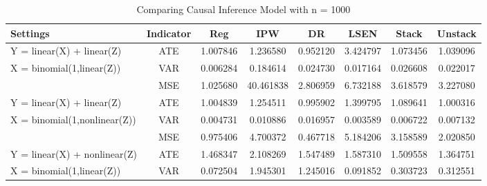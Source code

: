 \documentclass{elegantpaper}
\begin{document}
\begin{table}[H]
  \small
  \centering
  \caption{Comparing Causal Inference Model with n = 1000}
    \begin{tabular}{llllllll}
    \toprule
    Settings & \multicolumn{1}{c}{Indicator} &\multicolumn{1}{c}{Reg} & \multicolumn{1}{c}{IPW} & \multicolumn{1}{c}{DR} & \multicolumn{1}{c}{LSEN} & \multicolumn{1}{c}{Stack} & \multicolumn{1}{c}{Unstack}\\
   
    \midrule
    Y = linear(X) + linear(Z) & \multicolumn{1}{c}{ATE} & \multicolumn{1}{c}{1.007846} & \multicolumn{1}{c}{1.236580} & \multicolumn{1}{c}{0.952120} & \multicolumn{1}{c}{3.424797}& \multicolumn{1}{c}{1.073456} & \multicolumn{1}{c}{1.039096}\\
    X = binomial(1,linear(Z)) & \multicolumn{1}{c}{VAR} & \multicolumn{1}{c}{0.006284} & \multicolumn{1}{c}{0.184614} & \multicolumn{1}{c}{0.024730} & \multicolumn{1}{c}{0.017164}& \multicolumn{1}{c}{0.026608} & \multicolumn{1}{c}{0.022017}\\
        & \multicolumn{1}{c}{MSE} & \multicolumn{1}{c}{1.025680} & \multicolumn{1}{c}{40.461838} & \multicolumn{1}{c}{2.806959} & \multicolumn{1}{c}{6.732188}& \multicolumn{1}{c}{3.618579} & \multicolumn{1}{c}{3.227080}\\%
     \midrule              
     Y = linear(X) + linear(Z) & \multicolumn{1}{c}{ATE} & \multicolumn{1}{c}{1.004839} & \multicolumn{1}{c}{1.254511} & \multicolumn{1}{c}{0.995902} & \multicolumn{1}{c}{1.399795}& \multicolumn{1}{c}{1.089641} & \multicolumn{1}{c}{1.000316}\\
    X = binomial(1,nonlinear(Z)) & \multicolumn{1}{c}{VAR} & \multicolumn{1}{c}{0.004731} & \multicolumn{1}{c}{0.010886} & \multicolumn{1}{c}{0.016957} & \multicolumn{1}{c}{0.003589}& \multicolumn{1}{c}{ 0.006722} & \multicolumn{1}{c}{0.007132}\\
     & \multicolumn{1}{c}{MSE} & \multicolumn{1}{c}{0.975406} & \multicolumn{1}{c}{ 4.700372} & \multicolumn{1}{c}{0.467718} & \multicolumn{1}{c}{ 5.184206}& \multicolumn{1}{c}{ 3.158589} & \multicolumn{1}{c}{2.020850}\\%
    \midrule                
    Y = linear(X) + nonlinear(Z) & \multicolumn{1}{c}{ATE} & \multicolumn{1}{c}{1.468347} & \multicolumn{1}{c}{ 2.108269} & \multicolumn{1}{c}{ 1.547489} & \multicolumn{1}{c}{ 1.587310}& \multicolumn{1}{c}{1.509558} & \multicolumn{1}{c}{1.364751}\\
    X = binomial(1,linear(Z)) & \multicolumn{1}{c}{VAR} & \multicolumn{1}{c}{0.072504} & \multicolumn{1}{c}{1.945301} & \multicolumn{1}{c}{1.245016} & \multicolumn{1}{c}{0.091852}& \multicolumn{1}{c}{0.303723} & \multicolumn{1}{c}{0.312551}\\

\end{tabular}
\end{table}
\end{document}
